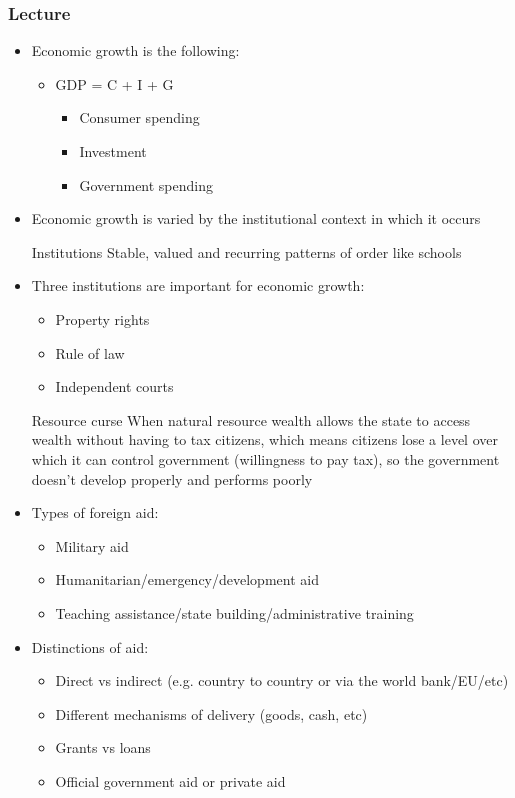 \documentclass[11pt]{article}
\begin{document}
\subsubsection{Lecture}
\label{sec:org9f5d1d9}
\begin{itemize}
\item Economic growth is the following:
\begin{itemize}
\item GDP = C + I + G
\begin{itemize}
\item Consumer spending
\item Investment
\item Government spending
\end{itemize}
\end{itemize}
\item Economic growth is varied by the institutional context in which it occurs
\item[{Institutions}] Stable, valued and recurring patterns of order like schools
\item Three institutions are important for economic growth:
\begin{itemize}
\item Property rights
\item Rule of law
\item Independent courts
\end{itemize}
\item[{Resource curse}] When natural resource wealth allows the state to access
wealth without having to tax citizens, which means citizens lose a level over
which it can control government (willingness to pay tax), so the government
doesn't develop properly and performs poorly
\item Types of foreign aid:
\begin{itemize}
\item Military aid
\item Humanitarian/emergency/development aid
\item Teaching assistance/state building/administrative training
\end{itemize}
\item Distinctions of aid:
\begin{itemize}
\item Direct vs indirect (e.g. country to country or via the world bank/EU/etc)
\item Different mechanisms of delivery (goods, cash, etc)
\item Grants vs loans
\item Official government aid or private aid

\end{itemize}
\end{itemize}
\end{document}
